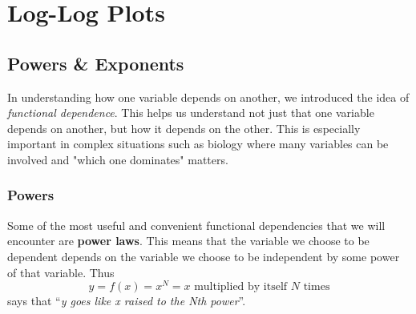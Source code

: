 \chapter{Log-Log Plots}
\thispagestyle{fancy}

\section{Powers \& Exponents}
In understanding how one variable depends on another, we introduced the idea of \emph{functional dependence}.
This helps us understand not just that one variable depends on another, but how it depends on the other.
This is especially important in complex situations such as biology where many variables can be involved and "which one dominates" matters.

\subsection*{Powers}
Some of the most useful and convenient functional dependencies that we will encounter are \textbf{power laws}.
This means that the variable we choose to be dependent depends on the variable we choose to be independent by some power of that variable.
Thus
\[ y = f(x) = x^{N} = x \text{ multiplied by itself } N \text{ times} \]
says that ``\emph{y goes like x raised to the Nth power}''.

